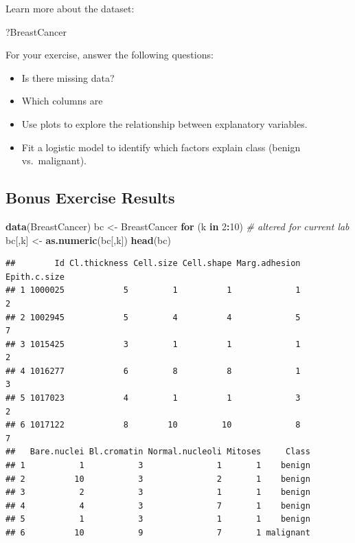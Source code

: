 \documentclass[
]{book}
\newenvironment{Shaded}{\begin{snugshade}}{\end{snugshade}}
\newcommand{\CommentTok}[1]{\textcolor[rgb]{0.56,0.35,0.01}{\textit{#1}}}
\newcommand{\ControlFlowTok}[1]{\textcolor[rgb]{0.13,0.29,0.53}{\textbf{#1}}}
\newcommand{\DecValTok}[1]{\textcolor[rgb]{0.00,0.00,0.81}{#1}}
\newcommand{\FunctionTok}[1]{\textcolor[rgb]{0.13,0.29,0.53}{\textbf{#1}}}
\newcommand{\NormalTok}[1]{#1}
\newcommand{\OtherTok}[1]{\textcolor[rgb]{0.56,0.35,0.01}{#1}}
\newcommand{\SpecialCharTok}[1]{\textcolor[rgb]{0.81,0.36,0.00}{\textbf{#1}}}
\providecommand{\tightlist}{%
  \setlength{\itemsep}{0pt}\setlength{\parskip}{0pt}}
\begin{document}
Learn more about the dataset:

\begin{Shaded}
\begin{Highlighting}[]
\NormalTok{?BreastCancer}
\end{Highlighting}
\end{Shaded}

For your exercise, answer the following questions:

\begin{itemize}
\tightlist
\item
  Is there missing data?
\item
  Which columns are
\item
  Use plots to explore the relationship between explanatory variables.
\item
  Fit a logistic model to identify which factors explain class (benign vs.~malignant).
\end{itemize}

\subsection{Bonus Exercise Results}\label{bonus-exercise-results-2}

\begin{Shaded}
\begin{Highlighting}[]
\FunctionTok{data}\NormalTok{(BreastCancer)}
\NormalTok{bc }\OtherTok{\textless{}{-}}\NormalTok{ BreastCancer}
\ControlFlowTok{for}\NormalTok{ (k }\ControlFlowTok{in} \DecValTok{2}\SpecialCharTok{:}\DecValTok{10}\NormalTok{) }\CommentTok{\# altered for current lab}
\NormalTok{    bc[,k] }\OtherTok{\textless{}{-}} \FunctionTok{as.numeric}\NormalTok{(bc[,k]) }
\FunctionTok{head}\NormalTok{(bc)}
\end{Highlighting}
\end{Shaded}

\begin{verbatim}
##        Id Cl.thickness Cell.size Cell.shape Marg.adhesion Epith.c.size
## 1 1000025            5         1          1             1            2
## 2 1002945            5         4          4             5            7
## 3 1015425            3         1          1             1            2
## 4 1016277            6         8          8             1            3
## 5 1017023            4         1          1             3            2
## 6 1017122            8        10         10             8            7
##   Bare.nuclei Bl.cromatin Normal.nucleoli Mitoses     Class
## 1           1           3               1       1    benign
## 2          10           3               2       1    benign
## 3           2           3               1       1    benign
## 4           4           3               7       1    benign
## 5           1           3               1       1    benign
## 6          10           9               7       1 malignant
\end{verbatim}
\end{document}
